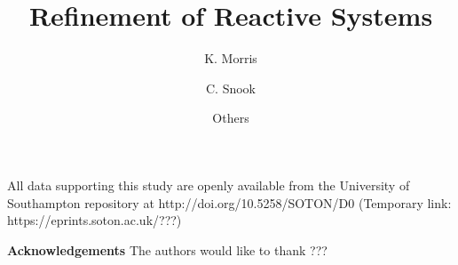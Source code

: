 \documentclass[runningheads,a4paper]{llncs}
\begin{document}
\title{Refinement of Reactive Systems} 


%
%
\author{K. Morris \and C. Snook \and Others}


%
\institute{
	Sandia, USA\\
	ECS, University of Southampton, U.K.\\
}


\maketitle














\vspace{-1 pt}

\begin{scriptsize}
	
	\par
	\noindent
	All data supporting this study are openly available from the University of Southampton repository at
	http://doi.org/10.5258/SOTON/D0 (Temporary link: https://eprints.soton.ac.uk/???)\\
	
	\par
	\noindent
	\textbf{Acknowledgements} The authors would like to thank ???
	
\end{scriptsize}




\end{document}
